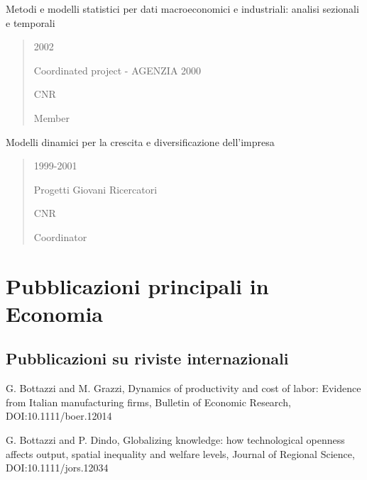 \documentclass[a4paper]{article}
\newenvironment{DUfieldlist}%
    {\quote\description}
    {\enddescription\endquote}
\begin{document}
Metodi e modelli statistici per dati macroeconomici e industriali:
analisi sezionali e temporali
%
\begin{quote}
%
\begin{DUfieldlist}
\item[{period:}]
2002

\item[{type:}]
Coordinated project - AGENZIA 2000

\item[{sponsor:}]
CNR

\item[{role:}]
Member

\end{DUfieldlist}

\end{quote}

Modelli dinamici per la crescita e diversificazione dell'impresa
%
\begin{quote}
%
\begin{DUfieldlist}
\item[{period:}]
1999-2001

\item[{type:}]
Progetti Giovani Ricercatori

\item[{sponsor:}]
CNR

\item[{role:}]
Coordinator

\end{DUfieldlist}

\end{quote}


\section{Pubblicazioni principali in Economia%
  \label{pubblicazioni-principali-in-economia}%
}


\subsection{Pubblicazioni su riviste internazionali%
  \label{pubblicazioni-su-riviste-internazionali}%
}

G. Bottazzi and M. Grazzi, Dynamics of productivity and cost of labor:
Evidence from Italian manufacturing firms, Bulletin of Economic
Research, DOI:10.1111/boer.12014

G. Bottazzi and P. Dindo, Globalizing knowledge: how technological
openness affects output, spatial inequality and welfare levels,
Journal of Regional Science, DOI:10.1111/jors.12034
\end{document}
